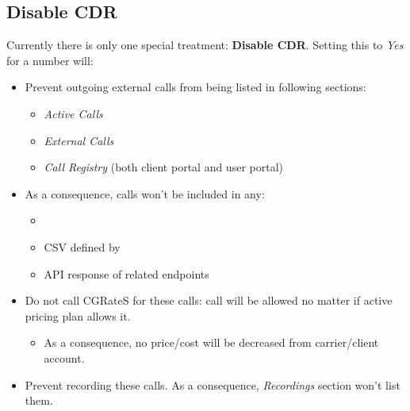\documentclass[letterpaper,10pt,english]{sphinxmanual}
\begin{document}
\subsection{Disable CDR}
\label{administration_portal/platform/global_special_numbers:disable-cdr}
Currently there is only one special treatment: \textbf{Disable CDR}. Setting this to \emph{Yes} for a number will:
\begin{itemize}
\item {} 
Prevent outgoing external calls from being listed in following sections:
\begin{itemize}
\item {} 
\emph{Active Calls}

\item {} 
\emph{External Calls}

\item {} 
\emph{Call Registry} (both client portal and user portal)

\end{itemize}

\item {} 
As a consequence, calls won't be included in any:
\begin{itemize}
\item {} 
{\hyperref[administration_portal/brand/invoicing/invoices:invoices]{}}

\item {} 
CSV defined by {\hyperref[administration_portal/brand/calls/call_csv_schedulers:call\string-csv\string-schedulers]{}}

\item {} 
API response of related endpoints

\end{itemize}

\item {} 
Do not call CGRateS for these calls: call will be allowed no matter if active pricing plan allows it.
\begin{itemize}
\item {} 
As a consequence, no price/cost will be decreased from carrier/client account.

\end{itemize}

\item {} 
Prevent recording these calls. As a consequence, \emph{Recordings} section won't list them.

\end{itemize}
\end{document}
